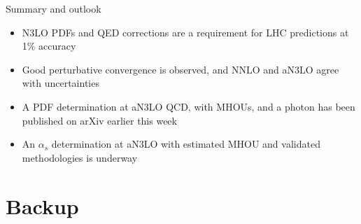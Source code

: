 \documentclass[8pt,t]{beamer}
\begin{document}
\begin{frame}[c]{Summary and outlook}
  \begin{itemize}\setlength{\itemsep}{30pt}
    \item N3LO PDFs and QED corrections are a requirement for LHC predictions at 1\% accuracy
    \item Good perturbative convergence is observed, and NNLO and aN3LO agree with uncertainties
    \item A PDF determination at aN3LO QCD, with MHOUs, and a photon has been published on arXiv earlier this week
    \item An $\alpha_s$ determination at aN3LO with estimated MHOU and validated methodologies is underway
  \end{itemize}

  \vspace*{7em}
\end{frame}



\appendix
\section{Backup}


\end{document}
